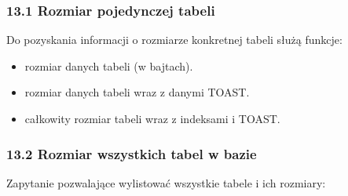 \documentclass[a4paper,11pt,openany,english]{sphinxmanual}
\begin{document}
\subsubsection{13.1 Rozmiar pojedynczej tabeli}
\label{\detokenize{rozdzial2/Konfiguracja_baz_danych/Konfiguracja_baz_danych:rozmiar-pojedynczej-tabeli}}
\sphinxAtStartPar
Do pozyskania informacji o rozmiarze konkretnej tabeli służą funkcje:
\begin{itemize}
\item {} 
\sphinxAtStartPar
{} \textendash{} rozmiar danych tabeli (w bajtach).

\item {} 
\sphinxAtStartPar
{} \textendash{} rozmiar danych tabeli wraz z danymi TOAST.

\item {} 
\sphinxAtStartPar
{} \textendash{} całkowity rozmiar tabeli wraz z indeksami i TOAST.

\end{itemize}

\sphinxAtStartPar
{}

\begin{sphinxVerbatim}[commandchars=\\\{\}]
    
    
    
\end{sphinxVerbatim}


\subsubsection{13.2 Rozmiar wszystkich tabel w bazie}
\label{\detokenize{rozdzial2/Konfiguracja_baz_danych/Konfiguracja_baz_danych:rozmiar-wszystkich-tabel-w-bazie}}
\sphinxAtStartPar
Zapytanie pozwalające wylistować wszystkie tabele i ich rozmiary:
\end{document}
